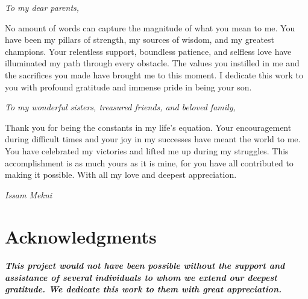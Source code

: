 \documentclass[a4paper,12pt]{report}
\begin{document}
{\selectfont %
\large

\textit{To my dear parents,}

No amount of words can capture the magnitude of what you mean to me. You have been my pillars of strength, my sources of wisdom, and my greatest champions. Your relentless support, boundless patience, and selfless love have illuminated my path through every obstacle. The values you instilled in me and the sacrifices you made have brought me to this moment. I dedicate this work to you with profound gratitude and immense pride in being your son.

\vspace{1cm}

\textit{To my wonderful sisters, treasured friends, and beloved family,}

Thank you for being the constants in my life's equation. Your encouragement during difficult times and your joy in my successes have meant the world to me. You have celebrated my victories and lifted me up during my struggles. This accomplishment is as much yours as it is mine, for you have all contributed to making it possible. With all my love and deepest appreciation.

}

\vspace{3cm}
\begin{flushright}
{\selectfont\Large\textit{Issam Mekni}}
\end{flushright}

\vspace{1cm}

\newpage


\chapter*{Acknowledgments}

\vspace{1cm}

\paragraph{This project would not have been possible without the support and assistance of several individuals to whom we extend our deepest gratitude. We dedicate this work to them with great appreciation.}

\vspace{0.5cm}
\end{document}
